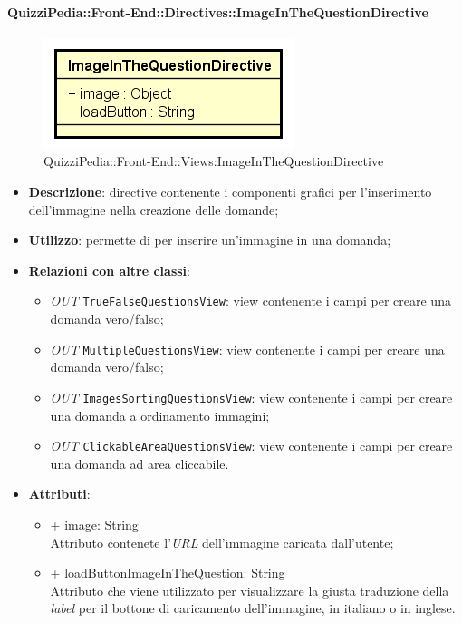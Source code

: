 \paragraph{QuizziPedia::Front-End::Directives::ImageInTheQuestionDirective}
\begin{figure} [ht]
	\centering
	\includegraphics[scale=0.80]{UML/Classi/Front-End/QuizziPedia_Front-end_ImageInTheQuestionDirective.png}
	\caption{QuizziPedia::Front-End::Views:ImageInTheQuestionDirective}
\end{figure} \FloatBarrier
\begin{itemize}
	\item \textbf{Descrizione}: directive contenente i componenti grafici per l'inserimento dell'immagine nella creazione delle domande;
	\item \textbf{Utilizzo}: permette di per inserire un'immagine in una domanda;
	\item \textbf{Relazioni con altre classi}:
	\begin{itemize}
		\item \textit{OUT} \texttt{TrueFalseQuestionsView}: view contenente i campi per creare una domanda vero/falso; 
		\item \textit{OUT} \texttt{MultipleQuestionsView}:  view contenente i campi per creare una domanda vero/falso; 
		\item \textit{OUT} \texttt{ImagesSortingQuestionsView}: view contenente i campi per creare una domanda a ordinamento immagini;
		\item \textit{OUT} \texttt{ClickableAreaQuestionsView}:  view contenente i campi per creare una domanda ad area cliccabile.
	\end{itemize}
	\item \textbf{Attributi}:
	\begin{itemize}
		\item {+ image: String} \\ Attributo contenete l'\textit{URL} dell'immagine caricata dall'utente;
		\item {+ loadButtonImageInTheQuestion: String} \\ Attributo che viene utilizzato per visualizzare la giusta traduzione della \textit{label} per il bottone di caricamento dell'immagine, in italiano o in inglese. 
	\end{itemize}
\end{itemize}